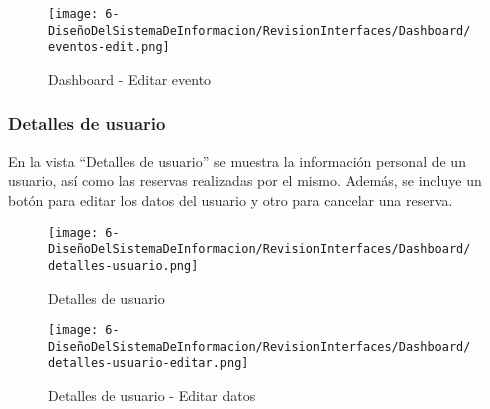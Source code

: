\begin{figure}[H]
	\centering
	\texttt{[image: 6-DiseñoDelSistemaDeInformacion/RevisionInterfaces/Dashboard/eventos-edit.png]}
	\caption{Dashboard - Editar evento}
\end{figure}

\subsubsection*{Detalles de usuario}
En la vista “Detalles de usuario” se muestra la información personal de un usuario, así como las reservas realizadas por el mismo.
Además, se incluye un botón para editar los datos del usuario y otro para cancelar una reserva.

\begin{figure}[H]
	\centering
	\texttt{[image: 6-DiseñoDelSistemaDeInformacion/RevisionInterfaces/Dashboard/detalles-usuario.png]}
	\caption{Detalles de usuario}
\end{figure}

\begin{figure}[H]
	\centering
	\texttt{[image: 6-DiseñoDelSistemaDeInformacion/RevisionInterfaces/Dashboard/detalles-usuario-editar.png]}
	\caption{Detalles de usuario - Editar datos}
\end{figure}
